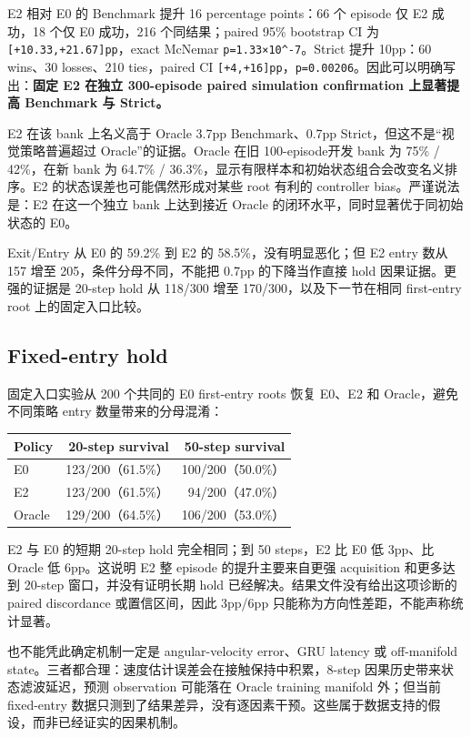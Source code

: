 E2 相对 E0 的 Benchmark 提升 16 percentage points：66 个 episode 仅 E2 成功，18 个仅 E0 成功，216 个同结果；paired 95\% bootstrap CI 为 \texttt{{[}+10.33,+21.67{]}pp}，exact McNemar \texttt{p=1.33×10\^{}-7}。Strict 提升 10pp：60 wins、30 losses、210 ties，paired CI \texttt{{[}+4,+16{]}pp}，\texttt{p=0.00206}。因此可以明确写出：\textbf{固定 E2 在独立 300-episode paired simulation confirmation 上显著提高 Benchmark 与 Strict。}

E2 在该 bank 上名义高于 Oracle 3.7pp Benchmark、0.7pp Strict，但这不是``视觉策略普遍超过 Oracle''的证据。Oracle 在旧 100-episode开发 bank 为 75\% / 42\%，在新 bank 为 64.7\% / 36.3\%，显示有限样本和初始状态组合会改变名义排序。E2 的状态误差也可能偶然形成对某些 root 有利的 controller bias。严谨说法是：E2 在这一个独立 bank 上达到接近 Oracle 的闭环水平，同时显著优于同初始状态的 E0。

Exit/Entry 从 E0 的 59.2\% 到 E2 的 58.5\%，没有明显恶化；但 E2 entry 数从 157 增至 205，条件分母不同，不能把 0.7pp 的下降当作直接 hold 因果证据。更强的证据是 20-step hold 从 118/300 增至 170/300，以及下一节在相同 first-entry root 上的固定入口比较。

\hypertarget{fixed-entry-hold}{%
\subsection{Fixed-entry hold}\label{fixed-entry-hold}}

固定入口实验从 200 个共同的 E0 first-entry roots 恢复 E0、E2 和 Oracle，避免不同策略 entry 数量带来的分母混淆：

\begin{longtable}[]{@{}lrr@{}}
\toprule\noalign{}
Policy & 20-step survival & 50-step survival \\
\midrule\noalign{}
\endhead
\bottomrule\noalign{}
\endlastfoot
E0 & 123/200（61.5\%） & 100/200（50.0\%） \\
E2 & 123/200（61.5\%） & 94/200（47.0\%） \\
Oracle & 129/200（64.5\%） & 106/200（53.0\%） \\
\end{longtable}

E2 与 E0 的短期 20-step hold 完全相同；到 50 steps，E2 比 E0 低 3pp、比 Oracle 低 6pp。这说明 E2 整 episode 的提升主要来自更强 acquisition 和更多达到 20-step 窗口，并没有证明长期 hold 已经解决。结果文件没有给出这项诊断的 paired discordance 或置信区间，因此 3pp/6pp 只能称为方向性差距，不能声称统计显著。

也不能凭此确定机制一定是 angular-velocity error、GRU latency 或 off-manifold state。三者都合理：速度估计误差会在接触保持中积累，8-step 因果历史带来状态滤波延迟，预测 observation 可能落在 Oracle training manifold 外；但当前 fixed-entry 数据只测到了结果差异，没有逐因素干预。这些属于数据支持的假设，而非已经证实的因果机制。

